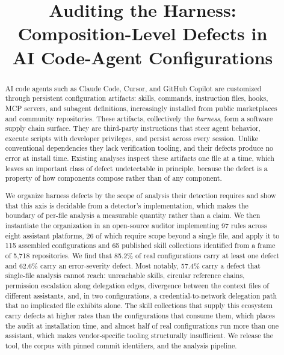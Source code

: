 \documentclass[conference]{IEEEtran}
\begin{document}
\title{Auditing the Harness: Composition-Level Defects in\\
AI Code-Agent Configurations}

\author{
}

\maketitle

\begin{abstract}
AI code agents such as Claude Code, Cursor, and GitHub Copilot are customized
through persistent configuration artifacts: skills, commands, instruction files,
hooks, MCP servers, and subagent definitions, increasingly installed from public
marketplaces and community repositories. These artifacts, collectively the
\emph{harness}, form a software supply chain surface. They are third-party
instructions that steer agent behavior, execute scripts with developer
privileges, and persist across every session. Unlike conventional dependencies
they lack verification tooling, and their defects produce no error at install
time. Existing analyses inspect these artifacts one file at a time, which leaves
an important class of defect undetectable in principle, because the defect is a
property of how components compose rather than of any component.

We organize harness defects by the scope of analysis their detection requires
and show that this axis is decidable from a detector's implementation, which
makes the boundary of per-file analysis a measurable quantity rather than a
claim. We then instantiate the organization in an open-source auditor
implementing 97 rules across eight assistant platforms, 26 of which require
scope beyond a single file, and apply it to 115 assembled configurations and 65
published skill collections identified from a frame of 5{,}718 repositories. We
find that 85.2\% of real configurations carry at least one defect and 62.6\%
carry an error-severity defect. Most notably, 57.4\% carry a defect that
single-file analysis cannot reach: unreachable skills, circular reference
chains, permission escalation along delegation edges, divergence between the
context files of different assistants, and, in two configurations, a
credential-to-network delegation path that no implicated file exhibits alone.
The skill collections that supply this ecosystem carry defects at higher rates
than the configurations that consume them, which places the audit at
installation time, and almost half of real configurations run more than one
assistant, which makes vendor-specific tooling structurally insufficient. We
release the tool, the corpus with pinned commit identifiers, and the analysis
pipeline.
\end{abstract}
\end{document}
